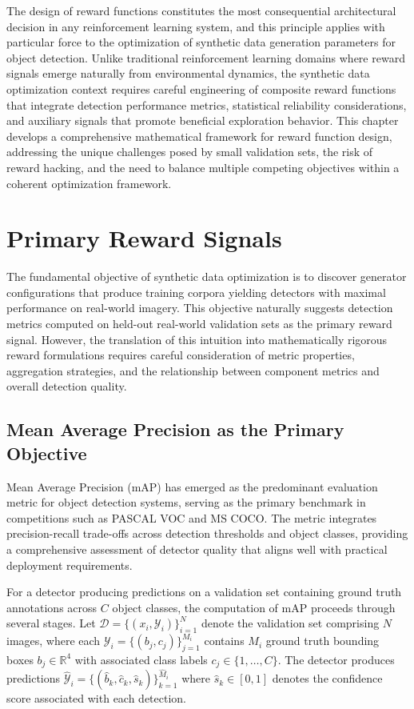 
The design of reward functions constitutes the most consequential architectural decision in any reinforcement learning system, and this principle applies with particular force to the optimization of synthetic data generation parameters for object detection. Unlike traditional reinforcement learning domains where reward signals emerge naturally from environmental dynamics, the synthetic data optimization context requires careful engineering of composite reward functions that integrate detection performance metrics, statistical reliability considerations, and auxiliary signals that promote beneficial exploration behavior. This chapter develops a comprehensive mathematical framework for reward function design, addressing the unique challenges posed by small validation sets, the risk of reward hacking, and the need to balance multiple competing objectives within a coherent optimization framework.

\section{Primary Reward Signals}
\label{sec:primary_reward}

The fundamental objective of synthetic data optimization is to discover generator configurations that produce training corpora yielding detectors with maximal performance on real-world imagery. This objective naturally suggests detection metrics computed on held-out real-world validation sets as the primary reward signal. However, the translation of this intuition into mathematically rigorous reward formulations requires careful consideration of metric properties, aggregation strategies, and the relationship between component metrics and overall detection quality.

\subsection{Mean Average Precision as the Primary Objective}

Mean Average Precision (mAP) has emerged as the predominant evaluation metric for object detection systems, serving as the primary benchmark in competitions such as PASCAL VOC and MS COCO. The metric integrates precision-recall trade-offs across detection thresholds and object classes, providing a comprehensive assessment of detector quality that aligns well with practical deployment requirements.

For a detector producing predictions on a validation set containing ground truth annotations across $C$ object classes, the computation of mAP proceeds through several stages. Let $\mathcal{D} = \{(x_i, \mathcal{Y}_i)\}_{i=1}^{N}$ denote the validation set comprising $N$ images, where each $\mathcal{Y}_i = \{(b_j, c_j)\}_{j=1}^{M_i}$ contains $M_i$ ground truth bounding boxes $b_j \in \mathbb{R}^4$ with associated class labels $c_j \in \{1, \ldots, C\}$. The detector produces predictions $\hat{\mathcal{Y}}_i = \{(\hat{b}_k, \hat{c}_k, \hat{s}_k)\}_{k=1}^{\hat{M}_i}$ where $\hat{s}_k \in [0, 1]$ denotes the confidence score associated with each detection.

